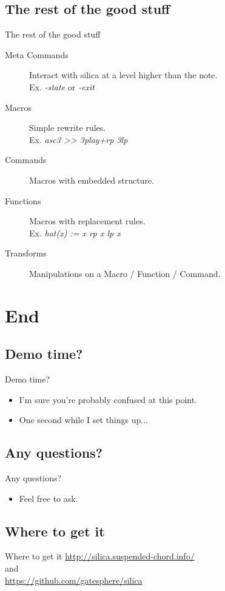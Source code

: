 \documentclass[12pt]{beamer}
\renewcommand{\texttt}[2][ttcolor]{\textcolor{#1}{\ttfamily #2}}%
\begin{document}
\subsection{The rest of the good stuff}
\begin{frame}{The rest of the good stuff}
  \begin{description}
    \item[Meta Commands] Interact with silica at a level higher than the note.  \\Ex. \textit{\texttt{-state}} or \textit{\texttt{-exit}}
    \item[Macros] Simple rewrite rules.  \\Ex. \textit{\texttt{asc3 >> 3play+rp 3lp}}
    \item[Commands] Macros with embedded structure.
    \item[Functions] Macros with replacement rules.  \\Ex. \textit{\texttt{hat(x) := x rp x lp x}}
    \item[Transforms] Manipulations on a Macro / Function / Command.
  \end{description}
\end{frame}

\section{End}
\subsection{Demo time?}
\begin{frame}{Demo time?}
  \begin{itemize}
    \item I'm sure you're probably confused at this point.
    \item One second while I set things up...
  \end{itemize}
\end{frame}

\subsection{Any questions?}
\begin{frame}{Any questions?}
  \begin{itemize}
    \item Feel free to ask.
  \end{itemize}
\end{frame}

\subsection{Where to get it}
\begin{frame}{Where to get it}
  \url{http://silica.suspended-chord.info/} \\
  and\\
  \url{https://github.com/gatesphere/silica}
\end{frame}
\end{document}
